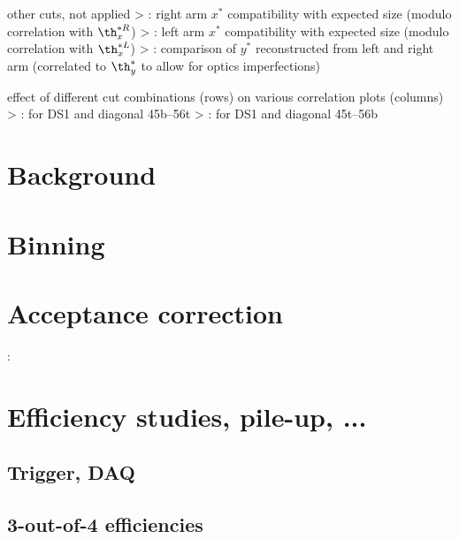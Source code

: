 \> other cuts, not applied
\>>  : right arm $x^*$ compatibility with expected size (modulo correlation with $\th_x^{*R}$)
\>>  : left arm $x^*$ compatibility with expected size (modulo correlation with $\th_x^{*L}$)
\>>  : comparison of $y^*$ reconstructed from left and right arm (correlated to $\th_y^*$ to allow for optics imperfections)

\> effect of different cut combinations (rows) on various correlation plots (columns)
\>> : for DS1 and diagonal 45b--56t
\>> : for DS1 and diagonal 45t--56b

\section{Background}


\section{Binning}


\section{Acceptance correction}

\> 

\>  : 


\section{Efficiency studies, pile-up, ...}

\subsection{Trigger, DAQ}

\subsection{3-out-of-4 efficiencies}


